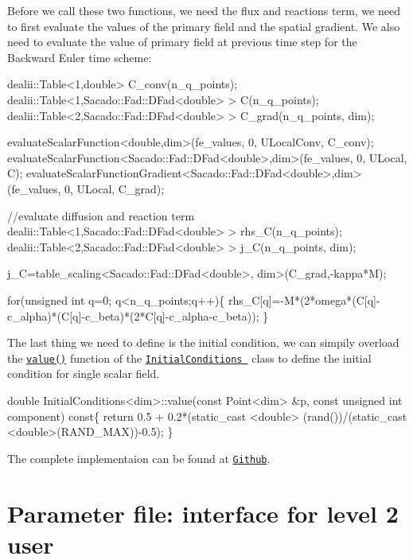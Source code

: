 Before we call these two functions, we need the flux and reactions term, we need to first evaluate the values of the primary field and the spatial gradient. We also need to evaluate the value of primary field at previous time step for the Backward Euler time scheme\-: 
\begin{DoxyCode}
dealii::Table<1,double>  C\_conv(n\_q\_points);
dealii::Table<1,Sacado::Fad::DFad<double> >  C(n\_q\_points);
dealii::Table<2,Sacado::Fad::DFad<double> >  C\_grad(n\_q\_points, dim);

evaluateScalarFunction<double,dim>(fe\_values, 0, ULocalConv, C\_conv);
evaluateScalarFunction<Sacado::Fad::DFad<double>,dim>(fe\_values, 0, ULocal, C); 
evaluateScalarFunctionGradient<Sacado::Fad::DFad<double>,dim>(fe\_values, 0, ULocal, C\_grad);

\textcolor{comment}{//evaluate diffusion and reaction term}
dealii::Table<1,Sacado::Fad::DFad<double> > rhs\_C(n\_q\_points);
dealii::Table<2,Sacado::Fad::DFad<double> > j\_C(n\_q\_points, dim);

j\_C=table\_scaling<Sacado::Fad::DFad<double>, dim>(C\_grad,-kappa*M);

\textcolor{keywordflow}{for}(\textcolor{keywordtype}{unsigned} \textcolor{keywordtype}{int} q=0; q<n\_q\_points;q++)\{
     rhs\_C[q]=-M*(2*omega*(C[q]-c\_alpha)*(C[q]-c\_beta)*(2*C[q]-c\_alpha-c\_beta));
 \}
\end{DoxyCode}
 The last thing we need to define is the initial condition, we can simpily overload the \href{../html/class_initial_conditions.html#a369cea7ba74f8cd0a6ca12e0c164ff74}{\tt value()} function of the \href{../html/class_initial_conditions.html}{\tt Initial\-Conditions } class to define the initial condition for single scalar field. 
\begin{DoxyCode}
\textcolor{keywordtype}{double} InitialConditions<dim>::value(\textcolor{keyword}{const} Point<dim>   &p, \textcolor{keyword}{const} \textcolor{keywordtype}{unsigned} \textcolor{keywordtype}{int}  component)\textcolor{keyword}{ const}\{
  \textcolor{keywordflow}{return} 0.5 + 0.2*(static\_cast <\textcolor{keywordtype}{double}> (rand())/(static\_cast <double>(RAND\_MAX))-0.5); 
\}
\end{DoxyCode}


The complete implementaion can be found at \href{https://github.com/mechanoChem/mechanoChemFEM/tree/example/Example3_Allen-Cahn}{\tt Github}.\hypertarget{growth_file}{}\section{Parameter file\-: interface for level 2 user}\label{growth_file}

